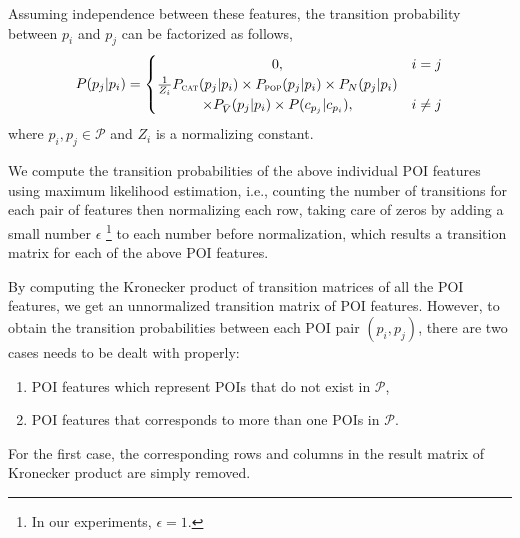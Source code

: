 Assuming independence between these features,
the transition probability between $p_i$ and $p_j$ can be factorized as follows,
\begin{displaymath}
    P(p_j | p_i) =
    \begin{cases}
    \hfill 0, \hfill & i = j \\
    \hfill \frac{1}{Z_i} P_{\textsc{cat}}(p_j | p_i) \times P_{\textsc{pop}}(p_j | p_i) \times P_N(p_j | p_i) \\
    \hfill \times P_{\bar{V}}(p_j | p_i) \times P(c_{p_j} | c_{p_i}), \hfill & i \ne j
    \end{cases}
\end{displaymath}
where $p_i, p_j \in \mathcal{P}$ and $Z_i$ is a normalizing constant.


We compute the transition probabilities of the above individual POI features
using maximum likelihood estimation,
i.e., counting the number of transitions for each pair of features then normalizing each row,
taking care of zeros by adding a small number $\epsilon$
\footnote{In our experiments, $\epsilon = 1$.}
to each number before normalization,
which results a transition matrix for each of the above POI features.

By computing the Kronecker product of transition matrices of all the POI features,
we get an unnormalized transition matrix of POI features.
However, to obtain the transition probabilities between each POI pair $(p_i, p_j)$,
there are two cases needs to be dealt with properly:
\begin{enumerate}
\item POI features which represent POIs that do not exist in $\mathcal{P}$,
\item POI features that corresponds to more than one POIs in $\mathcal{P}$.
\end{enumerate}

For the first case,
the corresponding rows and columns in the result matrix of Kronecker product are simply removed.

